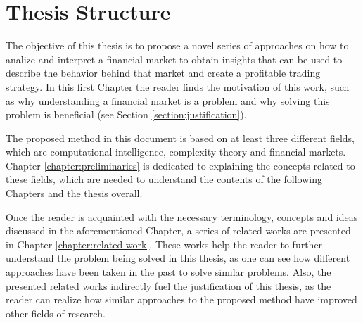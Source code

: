 \section{Thesis Structure}
\label{section:thesis-structure}


The objective of this thesis is to propose a novel series of approaches on how %
to analize and interpret a financial market to obtain insights that can be
used to describe the behavior behind that market and create a profitable trading 
strategy. In this first Chapter the reader finds the motivation of this work,
such as why understanding a financial market is a problem and why solving this
problem is beneficial (see Section \ref{section:justification}).




The proposed method in this document is based on at least three different
fields, which are computational intelligence, complexity theory and financial
markets. Chapter \ref{chapter:preliminaries} is dedicated to explaining the
concepts related to these fields, which are needed to understand the contents of
the following Chapters and the thesis overall.


Once the reader is acquainted with the necessary terminology, concepts and ideas
discussed in the aforementioned Chapter, a series of related works are presented
in Chapter \ref{chapter:related-work}. These works help the reader to further
understand the problem being solved in this thesis, as one can see how different
approaches have been taken in the past to solve similar problems. Also, the
presented related works indirectly fuel the justification of this thesis, as the
reader can realize how similar approaches to the proposed method have improved
other fields of research.

